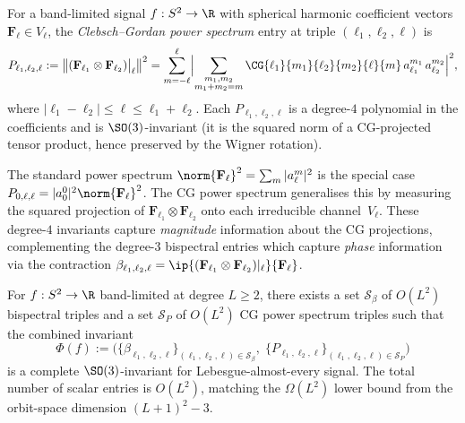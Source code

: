 

\begin{definition}
\label{def:cg-power}
For a band-limited signal $f : S^2 \to \R$ with spherical harmonic
coefficient vectors $\mathbf{F}_\ell \in V_\ell$, the
\emph{Clebsch--Gordan power spectrum} entry at triple
$(\ell_1, \ell_2, \ell)$ is
\[
  P_{\ell_1,\ell_2,\ell}
  := \bigl\lVert
    (\mathbf{F}_{\ell_1} \otimes \mathbf{F}_{\ell_2})\big|_\ell
  \bigr\rVert^2
  = \sum_{m=-\ell}^{\ell}
    \Bigl| \sum_{\substack{m_1, m_2 \\ m_1+m_2=m}}
    \CG{\ell_1}{m_1}{\ell_2}{m_2}{\ell}{m}\,
    a_{\ell_1}^{m_1}\, a_{\ell_2}^{m_2} \Bigr|^2,
\]
where $|\ell_1-\ell_2| \le \ell \le \ell_1+\ell_2$.
Each $P_{\ell_1,\ell_2,\ell}$ is a degree-$4$ polynomial in the
coefficients and is $\SO(3)$-invariant (it is the squared norm of a
CG-projected tensor product, hence preserved by the Wigner rotation).
\end{definition}

\begin{remark}
The standard power spectrum
$\norm{\mathbf{F}_\ell}^2 = \sum_m |a_\ell^m|^2$ is the special case
$P_{0,\ell,\ell} = |a_0^0|^2 \norm{\mathbf{F}_\ell}^2$. The CG power
spectrum generalises this by measuring the squared projection of
$\mathbf{F}_{\ell_1} \otimes \mathbf{F}_{\ell_2}$ onto each
irreducible channel~$V_\ell$.  These degree-$4$ invariants capture
\emph{magnitude} information about the CG projections, complementing
the degree-$3$ bispectral entries which capture \emph{phase}
information via the contraction
$\beta_{\ell_1,\ell_2,\ell}
  = \ip{(\mathbf{F}_{\ell_1} \otimes \mathbf{F}_{\ell_2})|_\ell}{\mathbf{F}_\ell}$.
\end{remark}



\begin{theorem}
\label{thm:so3-selective}
For $f : S^2 \to \R$ band-limited at degree $L \ge 2$, there exists a
set $\mathcal{S}_\beta$ of $O(L^2)$ bispectral triples and a set
$\mathcal{S}_P$ of $O(L^2)$ CG power spectrum triples such that the
combined invariant
\[
  \Phi(f) := \bigl(
    \{\beta_{\ell_1,\ell_2,\ell}\}_{(\ell_1,\ell_2,\ell) \in \mathcal{S}_\beta},\;
    \{P_{\ell_1,\ell_2,\ell}\}_{(\ell_1,\ell_2,\ell) \in \mathcal{S}_P}
  \bigr)
\]
is a complete $\SO(3)$-invariant for Lebesgue-almost-every signal.
The total number of scalar entries is $O(L^2)$, matching the
$\Omega(L^2)$ lower bound from the orbit-space dimension
$(L{+}1)^2 - 3$.
\end{theorem}


